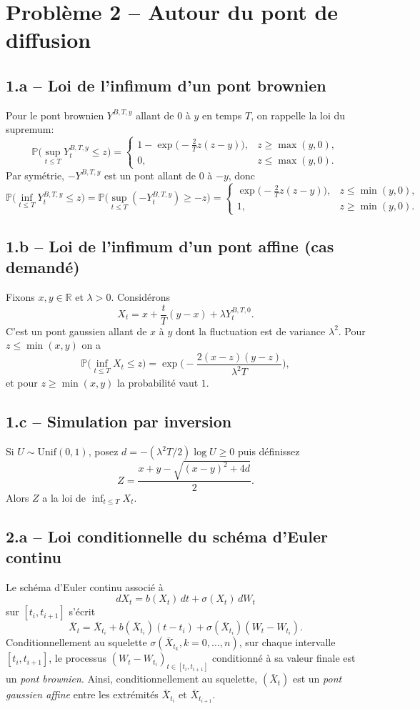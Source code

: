 \documentclass[11pt,a4paper]{article}
\newcommand{\Pp}{\mathbb{P}}
\newcommand{\R}{\mathbb{R}}
\newcommand{\1}{\mathbbm{1}}
\theoremstyle{plain}
\theoremstyle{definition}
\begin{document}
\section{Problème 2 -- Autour du pont de diffusion}
\subsection{1.a -- Loi de l'infimum d'un pont brownien}
Pour le pont brownien $Y^{B,T,y}$ allant de $0$ à $y$ en temps $T$, on rappelle la loi du supremum:
\[
\Pp\Big(\sup_{t\le T}Y^{B,T,y}_t\le z\Big)=
\begin{cases}
1-\exp\!\big(-\frac{2}{T}z(z-y)\big), & z\ge \max(y,0),\\
0, & z\le \max(y,0).
\end{cases}
\]
Par symétrie, $-Y^{B,T,y}$ est un pont allant de $0$ à $-y$, donc
\[
\Pp\Big(\inf_{t\le T}Y^{B,T,y}_t\le z\Big)
=\Pp\Big(\sup_{t\le T}(-Y^{B,T,y}_t)\ge -z\Big)
=
\begin{cases}
\exp\!\big(-\frac{2}{T}z(z-y)\big), & z\le \min(y,0),\\
1, & z\ge \min(y,0).
\end{cases}
\]

\subsection{1.b -- Loi de l'infimum d'un pont affine (cas demandé)}
Fixons $x,y\in\R$ et $\lambda>0$. Considérons
\[
X_t=x+\frac{t}{T}(y-x)+\lambda Y_t^{B,T,0}.
\]
C'est un pont gaussien allant de $x$ à $y$ dont la fluctuation est de variance $\lambda^2$.
Pour $z\le \min(x,y)$ on a
\[
\Pp\Big(\inf_{t\le T}X_t\le z\Big)=\exp\!\Big(-\frac{2(x-z)(y-z)}{\lambda^2 T}\Big),
\]
et pour $z\ge \min(x,y)$ la probabilité vaut $1$.

\subsection{1.c -- Simulation par inversion}
Si $U\sim\mathrm{Unif}(0,1)$, posez $d=-(\lambda^2T/2)\log U\ge 0$ puis définissez
\[
Z=\frac{x+y-\sqrt{(x-y)^2+4d}}{2}.
\]
Alors $Z$ a la loi de $\inf_{t\le T}X_t$.

\subsection{2.a -- Loi conditionnelle du schéma d'Euler continu}
Le schéma d'Euler continu associé à
\[
dX_t=b(X_t)\,dt+\sigma(X_t)\,dW_t
\]
sur $[t_i,t_{i+1}]$ s'écrit
\[
\bar X_t=\bar X_{t_i}+b(\bar X_{t_i})(t-t_i)+\sigma(\bar X_{t_i})(W_t-W_{t_i}).
\]
Conditionnellement au squelette $\sigma(\bar X_{t_k},k=0,\dots,n)$, sur chaque intervalle $[t_i,t_{i+1}]$, le processus $(W_t-W_{t_i})_{t\in[t_i,t_{i+1}]}$ conditionné à sa valeur finale est un \emph{pont brownien}. Ainsi, conditionnellement au squelette, $(\bar X_t)$ est un \emph{pont gaussien affine} entre les extrémités $\bar X_{t_i}$ et $\bar X_{t_{i+1}}$.
\end{document}
